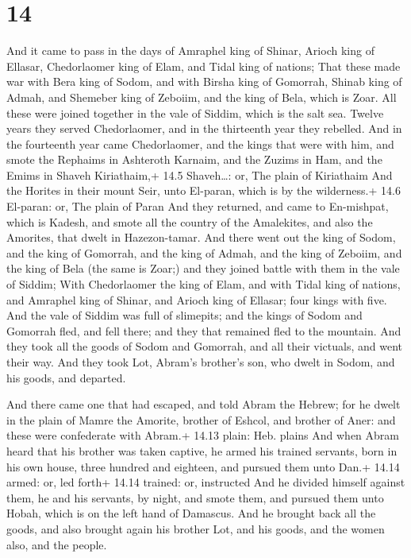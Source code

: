 \hypertarget{section-13}{%
\section{14}\label{section-13}}

 And it came to pass in the days of Amraphel king of Shinar,
Arioch king of Ellasar, Chedorlaomer king of Elam, and Tidal king of
nations;  That these made war with Bera king of Sodom, and
with Birsha king of Gomorrah, Shinab king of Admah, and Shemeber king of
Zeboiim, and the king of Bela, which is Zoar.  All these
were joined together in the vale of Siddim, which is the salt sea.
 Twelve years they served Chedorlaomer, and in the
thirteenth year they rebelled.  And in the fourteenth year
came Chedorlaomer, and the kings that were with him, and smote the
Rephaims in Ashteroth Karnaim, and the Zuzims in Ham, and the Emims in
Shaveh Kiriathaim,+ 14.5 Shaveh\ldots: or, The plain of Kiriathaim
 And the Horites in their mount Seir, unto El-paran, which
is by the wilderness.+ 14.6 El-paran: or, The plain of Paran
 And they returned, and came to En-mishpat, which is Kadesh,
and smote all the country of the Amalekites, and also the Amorites, that
dwelt in Hazezon-tamar.  And there went out the king of
Sodom, and the king of Gomorrah, and the king of Admah, and the king of
Zeboiim, and the king of Bela (the same is Zoar;) and they joined battle
with them in the vale of Siddim;  With Chedorlaomer the king
of Elam, and with Tidal king of nations, and Amraphel king of Shinar,
and Arioch king of Ellasar; four kings with five.  And the
vale of Siddim was full of slimepits; and the kings of Sodom and
Gomorrah fled, and fell there; and they that remained fled to the
mountain.  And they took all the goods of Sodom and
Gomorrah, and all their victuals, and went their way.  And
they took Lot, Abram's brother's son, who dwelt in Sodom, and his goods,
and departed.

 And there came one that had escaped, and told Abram the
Hebrew; for he dwelt in the plain of Mamre the Amorite, brother of
Eshcol, and brother of Aner: and these were confederate with Abram.+
14.13 plain: Heb. plains  And when Abram heard that his
brother was taken captive, he armed his trained servants, born in his
own house, three hundred and eighteen, and pursued them unto Dan.+ 14.14
armed: or, led forth+ 14.14 trained: or, instructed  And he
divided himself against them, he and his servants, by night, and smote
them, and pursued them unto Hobah, which is on the left hand of
Damascus.  And he brought back all the goods, and also
brought again his brother Lot, and his goods, and the women also, and
the people.

